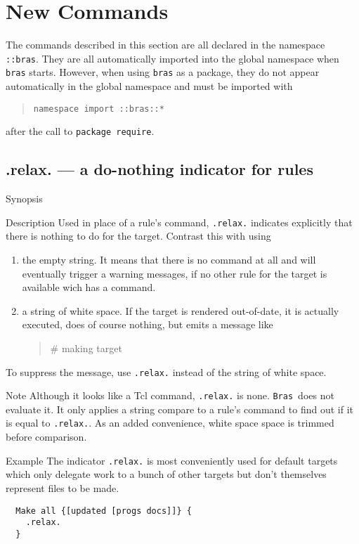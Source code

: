 \documentclass[11pt,bibtotoc,idxtotoc]{scrreprt}
\makeatletter
\newcommand{\bras}{\texttt{bras}}
\newcommand{\Bras}{\texttt{Bras}}
\newcommand{\indextt}[1]{\index{#1@\texttt{#1}}}
\newcommand{\Indextt}[1]{\texttt{#1}\index{#1@\texttt{#1}}}
\makeatother
\begin{document}
\section{New Commands}

The commands described in this section are all declared in the
namespace \texttt{::bras}. They are all automatically imported into the
global namespace when \bras{} starts. However, when using \bras{} as a
package, they do not appear automatically in the global namespace and
must be imported with \begin{quote}
  \texttt{namespace import ::bras::*}
\end{quote}
after the call to \texttt{package require}.

\subsection{.relax. --- a do-nothing indicator for rules}
\label{proc:.relax.}
\indextt{.relax.}
\begin{Describe}
\item[Synopsis] 
\item[Description] Used in place of a rule's command, \texttt{.relax.}
  indicates explicitly that there is nothing to do for the target.
  Contrast this with using
  \begin{enumerate}
  \item the empty string. It means that there is no command at all and
    will eventually trigger a warning messages, if no other rule for
    the target is available wich has a command.
  \item a string of white space. If the target is rendered
    out-of-date, it is actually executed, does of course nothing, but
    emits a message like
    \begin{quote}
      \ttfamily \# making target
    \end{quote}
  \end{enumerate}
  To suppress the message, use \Indextt{.relax.} instead of the
  string of white space.
\item[Note] Although it looks like a Tcl command, \texttt{.relax.} is
  none. \Bras\ does not evaluate it. It only applies a string compare
  to a rule's command to find out if it is equal to \texttt{.relax.}.
  As an added convenience, white space space is trimmed before
  comparison.
\item[Example] The indicator \texttt{.relax.} is most conveniently
  used for default targets which only delegate work to a bunch of other
  targets but don't themselves represent files to be made.
  \begin{verbatim}
  Make all {[updated [progs docs]]} {
    .relax.
  }
  \end{verbatim}
\end{Describe}
\end{document}
